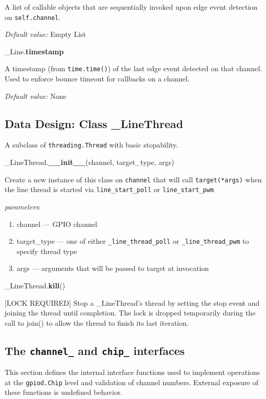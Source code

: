 \documentclass[12pt]{article}
\begin{document}
A list of callable objects that are sequentially invoked upon edge event detection on \texttt{self.channel}.

\textit{Default value:} Empty List

\noindent \_Line.\textbf{timestamp}

A timestamp (from \texttt{time.time()}) of the last edge event detected on that channel. Used to enforce bounce timeout for callbacks on a channel.

\textit{Default value:} None


\subsection{Data Design: Class \_LineThread}

A subclass of \texttt{threading.Thread} with basic stopability. 

\medskip

\noindent \_LineThread.\textbf{\_\_init\_\_}(channel, target\_type, args)
        
Create a new instance of this class on \texttt{channel} that will call \texttt{target(*args)} when the line thread is started via \texttt{line\_start\_poll} or \texttt{line\_start\_pwm}

\textit{parameters}:
\begin{enumerate}
        \item channel --- GPIO channel
	\item target\_type --- one of either \texttt{\_line\_thread\_poll} or \texttt{\_line\_thread\_pwm} to specify thread type
        \item args --- arguments that will be passed to target at invocation
\end{enumerate}
 

\noindent \_LineThread.\textbf{kill}()

[LOCK REQUIRED] Stop a \_LineThread's thread by setting the stop event and joining the thread until completion.
The lock is dropped temporarily during the call to join() to allow the thread to finish its last iteration.

\subsection{The  \texttt{channel\_} and \texttt{chip\_} interfaces}

This section defines the internal interface functions used to implement operations at the \texttt{gpiod.Chip} level and validation of channel numbers. External exposure of these functions is undefined behavior.
\end{document}
